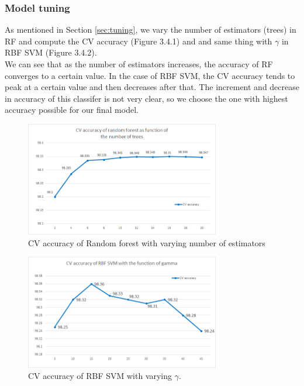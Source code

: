 \documentclass{article}
\begin{document}
\subsubsection{Model tuning}
As mentioned in Section \ref{sec:tuning}, we vary the number of estimators (trees) in RF and compute the CV accuracy (Figure 3.4.1) and and same thing with $\gamma$ in RBF SVM (Figure 3.4.2).\\
We can see that as the number of estimators increases, the accuracy of RF converges to a certain value. In the case of RBF SVM, the CV accuracy tends to peak at a certain value and then decreases after that. The increment and decrease in accuracy of this classifer is not very clear, so we choose the one with highest accuracy possible for our final model.

\begin{figure}[htb]
\begin{minipage}[b]{1.0\linewidth}
  \centering
  \centerline{\includegraphics[width=8.5cm]{RFestimator.png}}
\end{minipage}
\label{fig:RFestimator}
\caption{CV accuracy of Random forest with varying number of estimators}
\end{figure}
\begin{figure}[htb]
\begin{minipage}[b]{1.0\linewidth}
  \centering
  \centerline{\includegraphics[width=8.5cm]{RBFSVMgamma.png}}
\end{minipage}
\label{fig:RBFSVMgamma}
\caption{CV accuracy of RBF SVM with varying $\gamma$.}
\end{figure}
\end{document}
